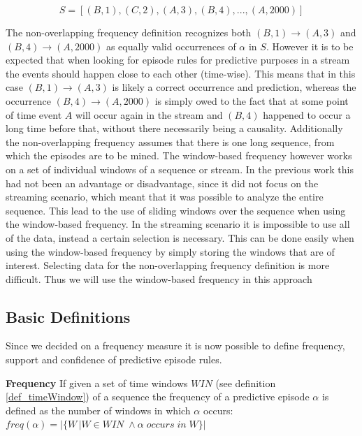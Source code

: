 \begin{equation}
S = [ (B,1),(C,2),(A,3),(B,4),...,(A,2000) ] 
\end{equation}

The non-overlapping frequency definition recognizes both $(B,1) \rightarrow (A,3)$ and $(B,4) \rightarrow (A,2000)$ as equally valid occurrences of $\alpha$ in $S$. However it is to be expected that when looking for episode rules for predictive purposes in a stream the events should happen close to each other (time-wise). This means that in this case $(B,1) \rightarrow (A,3)$ is likely a correct occurrence and prediction, whereas the occurrence $(B,4) \rightarrow (A,2000)$ is simply owed to the fact that at some point of time event $A$ will occur again in the stream and $(B,4)$ happened to occur a long time before that, without there necessarily being a causality.
Additionally the non-overlapping frequency assumes that there is one long sequence, from which the episodes are to be mined. The window-based frequency however works on a set of individual windows of a sequence or stream. In the previous work this had not been an advantage or disadvantage, since it did not focus on the streaming scenario, which meant that it was possible to analyze the entire sequence. This lead to the use of sliding windows over the sequence when using the window-based frequency. In the streaming scenario it is impossible to use all of the data, instead a certain selection is necessary. This can be done easily when using the window-based frequency by simply storing the windows that are of interest. Selecting data for the non-overlapping frequency definition is more difficult. Thus we will use the window-based frequency in this approach

\subsection{Basic Definitions}
Since we decided on a frequency measure it is now possible to define frequency, support and confidence of predictive episode rules.

\begin{mydef}
\label{def_frequency}
\textbf{Frequency} If given a set of time windows $WIN$ (see definition \ref{def_timeWindow}) of a sequence the frequency of a predictive episode $\alpha$ is defined as the number of windows in which $\alpha$ occurs: $freq(\alpha) = |\{W\,|W \in WIN\; \land \alpha\; occurs \; in \; W\}|$
\end{mydef}

